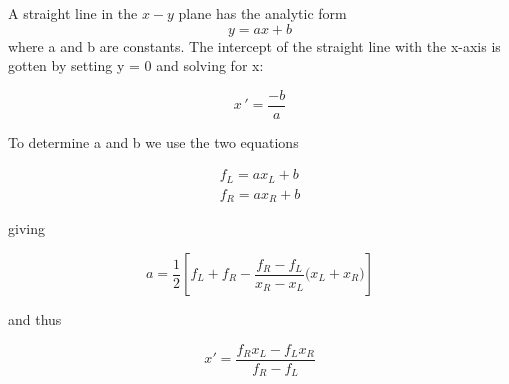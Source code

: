 A straight line in the $x-y$ plane has the analytic form
\begin{equation}
    y = ax + b
    \label{eq:06_11}
\end{equation}
where a and b are constants. The intercept of the straight line with the x-axis is gotten by setting y = 0 and solving for x:

\begin{equation}
x\,' = \frac{-b}{a}
\end{equation}

To determine a and b we use the two equations

\begin{equation}
\begin{aligned}
f_L = ax_L + b\\
f_R = ax_R + b
\end{aligned}
\end{equation}

giving

\begin{equation}
    a = \frac{1}{2}\left [f_L + f_R - \frac{f_R - f_L}{x_R - x_L} \big (x_L + x_R \big )\right ]
\end{equation}

and thus

\begin{equation}
x' = \frac{f_Rx_L - f_Lx_R}{f_R - f_L}
\end{equation}

